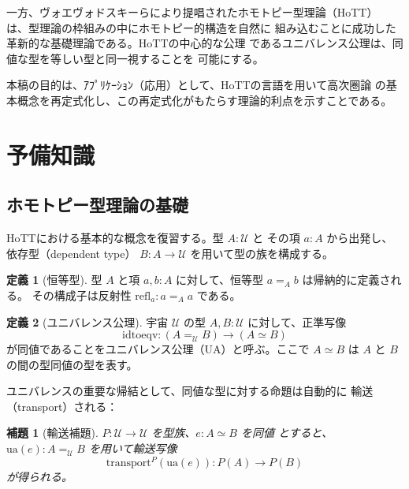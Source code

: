 \documentclass[12pt,a4paper]{article}
\newtheorem{lemma}[theorem]{補題}
\theoremstyle{definition}
\newtheorem{definition}{定義}[section]
\begin{document}
一方、ヴォエヴォドスキーらにより提唱されたホモトピー型理論（HoTT）
\cite{hottbook}は、型理論の枠組みの中にホモトピー的構造を自然に
組み込むことに成功した革新的な基礎理論である。HoTTの中心的な公理
であるユニバレンス公理は、同値な型を等しい型と同一視することを
可能にする。

本稿の目的は、ｱﾌﾟﾘｹｰｼｮﾝ（応用）として、HoTTの言語を用いて高次圏論
の基本概念を再定式化し、この再定式化がもたらす理論的利点を示すことである。


\section{予備知識}

\subsection{ホモトピー型理論の基礎}

HoTTにおける基本的な概念を復習する。型 $A : \mathcal{U}$ と
その項 $a : A$ から出発し、依存型（dependent type）
$B : A \to \mathcal{U}$ を用いて型の族を構成する。

\begin{definition}[恒等型]
型 $A$ と項 $a, b : A$ に対して、恒等型 $a =_A b$ は帰納的に定義される。
その構成子は反射性 $\mathrm{refl}_a : a =_A a$ である。
\end{definition}

\begin{definition}[ユニバレンス公理]
宇宙 $\mathcal{U}$ の型 $A, B : \mathcal{U}$ に対して、正準写像
\begin{equation}\label{eq:univalence}
  \mathrm{idtoeqv} : (A =_\mathcal{U} B) \to (A \simeq B)
\end{equation}
が同値であることをユニバレンス公理（UA）と呼ぶ。ここで $A \simeq B$ は
$A$ と $B$ の間の型同値の型を表す。
\end{definition}

ユニバレンスの重要な帰結として、同値な型に対する命題は自動的に
輸送（transport）される：

\begin{lemma}[輸送補題]
$P : \mathcal{U} \to \mathcal{U}$ を型族、$e : A \simeq B$ を同値
とすると、$\mathrm{ua}(e) : A =_\mathcal{U} B$ を用いて輸送写像
\begin{equation}
  \mathrm{transport}^P(\mathrm{ua}(e)) : P(A) \to P(B)
\end{equation}
が得られる。
\end{lemma}
\end{document}
